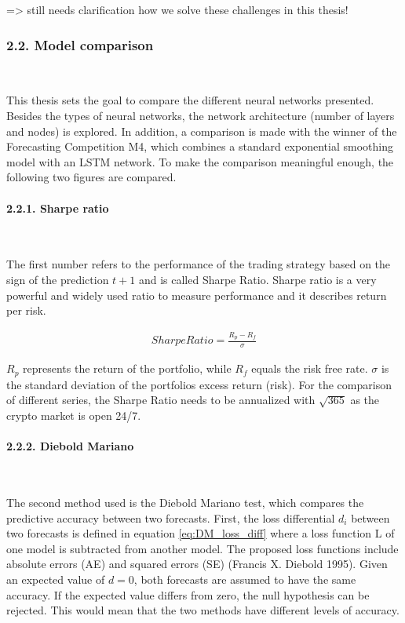 \documentclass[
]{article}
\begin{document}
=\textgreater{} still needs clarification how we solve these challenges
in this thesis!

\hypertarget{model_comparison}{%
\subsubsection{2.2. Model comparison}\label{model_comparison}}

~

This thesis sets the goal to compare the different neural networks
presented. Besides the types of neural networks, the network
architecture (number of layers and nodes) is explored. In addition, a
comparison is made with the winner of the Forecasting Competition M4,
which combines a standard exponential smoothing model with an LSTM
network. To make the comparison meaningful enough, the following two
figures are compared.

\hypertarget{sharpe_ratio}{%
\paragraph{2.2.1. Sharpe ratio}\label{sharpe_ratio}}

~

The first number refers to the performance of the trading strategy based
on the sign of the prediction \(t+1\) and is called Sharpe Ratio. Sharpe
ratio is a very powerful and widely used ratio to measure performance
and it describes return per risk.

\begin{align} \label{eq:Sharpe}
  SharpeRatio = \frac{R_{p}-R_{f}}{\sigma}
\end{align}

\(R_{p}\) represents the return of the portfolio, while \(R_{f}\) equals
the risk free rate. \(\sigma\) is the standard deviation of the
portfolios excess return (risk). For the comparison of different series,
the Sharpe Ratio needs to be annualized with \(\sqrt{365}\) as the
crypto market is open 24/7.

\hypertarget{diebold_mariano}{%
\paragraph{2.2.2. Diebold Mariano}\label{diebold_mariano}}

~

The second method used is the Diebold Mariano test, which compares the
predictive accuracy between two forecasts. First, the loss differential
\(d_{i}\) between two forecasts is defined in equation
\ref{eq:DM_loss_diff} where a loss function L of one model is subtracted
from another model. The proposed loss functions include absolute errors
(AE) and squared errors (SE) (Francis X. Diebold 1995). Given an
expected value of \(d = 0\), both forecasts are assumed to have the same
accuracy. If the expected value differs from zero, the null hypothesis
can be rejected. This would mean that the two methods have different
levels of accuracy.
\end{document}
